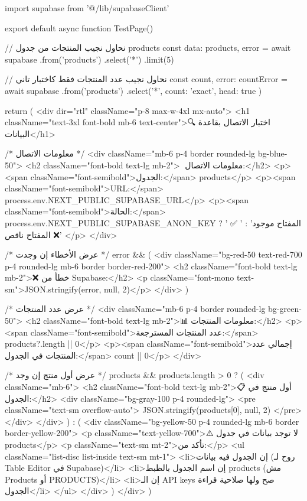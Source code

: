 import { supabase } from '@/lib/supabaseClient'

export default async function TestPage() {
  // نحاول نجيب المنتجات من جدول products
  const { data: products, error } = await supabase
    .from('products')
    .select('*')
    .limit(5)

  // نحاول نجيب عدد المنتجات فقط كاختبار تاني
  const { count, error: countError } = await supabase
    .from('products')
    .select('*', { count: 'exact', head: true })

  return (
    <div dir="rtl" className="p-8 max-w-4xl mx-auto">
      <h1 className="text-3xl font-bold mb-6 text-center">🔍 اختبار الاتصال بقاعدة البيانات</h1>
      
      {/* معلومات الاتصال */}
      <div className="mb-6 p-4 border rounded-lg bg-blue-50">
        <h2 className="font-bold text-lg mb-2">📌 معلومات الاتصال:</h2>
        <p><span className="font-semibold">الجدول:</span> products</p>
        <p><span className="font-semibold">URL:</span> {process.env.NEXT_PUBLIC_SUPABASE_URL}</p>
        <p><span className="font-semibold">الحالة:</span> 
          {process.env.NEXT_PUBLIC_SUPABASE_ANON_KEY ? 
            ' ✅ المفتاح موجود' : 
            ' ❌ المفتاح ناقص'}
        </p>
      </div>

      {/* عرض الأخطاء إن وجدت */}
      {error && (
        <div className="bg-red-50 text-red-700 p-4 rounded-lg mb-6 border border-red-200">
          <h2 className="font-bold text-lg mb-2">❌ خطأ من Supabase:</h2>
          <p className="font-mono text-sm">{JSON.stringify(error, null, 2)}</p>
        </div>
      )}

      {/* عرض عدد المنتجات */}
      <div className="mb-6 p-4 border rounded-lg bg-green-50">
        <h2 className="font-bold text-lg mb-2">📊 معلومات المنتجات:</h2>
        <p><span className="font-semibold">عدد المنتجات المسترجعة:</span> {products?.length || 0}</p>
        <p><span className="font-semibold">إجمالي عدد المنتجات في الجدول:</span> {count || 0}</p>
      </div>

      {/* عرض أول منتج إن وجد */}
      {products && products.length > 0 ? (
        <div className="mb-6">
          <h2 className="font-bold text-lg mb-2">📋 أول منتج في الجدول:</h2>
          <div className="bg-gray-100 p-4 rounded-lg">
            <pre className="text-sm overflow-auto">
              {JSON.stringify(products[0], null, 2)}
            </pre>
          </div>
        </div>
      ) : (
        <div className="bg-yellow-50 p-4 rounded-lg mb-6 border border-yellow-200">
          <p className="text-yellow-700">⚠️ لا توجد بيانات في جدول products</p>
          <p className="text-sm mt-2">تأكد من:</p>
          <ul className="list-disc list-inside text-sm mt-1">
            <li>إن الجدول فيه بيانات (روح لـ Table Editor في Supabase)</li>
            <li>إن اسم الجدول بالظبط products (مش Products أو PRODUCTS)</li>
            <li>إن الـ API keys صح ولها صلاحية قراءة الجدول</li>
          </ul>
        </div>
      )}
    </div>
  )
}